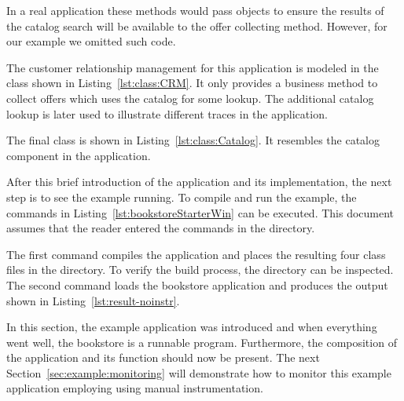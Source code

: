 In a real application these methods would pass objects to ensure the results of the catalog search will be available to the offer collecting method. However, for our example we omitted such code. 



\noindent The customer relationship management for this application is modeled in the  class shown in Listing~\ref{lst:class:CRM}. It only provides a business method to collect offers which uses the catalog for some lookup. The additional catalog lookup is later used to illustrate different traces in the application.



\noindent The final class is  shown in Listing~\ref{lst:class:Catalog}. It resembles the catalog component in the application.



\noindent After this brief introduction of the application and its implementation, the next step is to see the example running. To compile and run the example, the commands in Listing~\ref{lst:bookstoreStarterWin} can be executed. This document assumes that the reader entered the commands in the  directory.

\setBashListing
% 
%

\noindent The first command compiles the application and places the resulting four class files in the  directory. To verify the build process, the  directory can be inspected. The second command loads the bookstore application and produces the output shown in Listing~\ref{lst:result-noinstr}.



\noindent In this section, the \Kieker{} example application was introduced and when everything went well, the bookstore is a runnable program. Furthermore, the composition of the application and its function should now be present. %
The next Section~\ref{sec:example:monitoring} will demonstrate how %
to monitor this example application employing \KiekerMonitoringPart{} using manual instrumentation.


